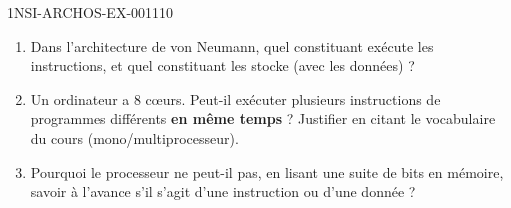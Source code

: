 \begin{exercice}{1NSI-ARCHOS-EX-001}{1}{10}
\begin{enumerate}
  \item Dans l'architecture de von Neumann, quel constituant exécute les instructions, et quel constituant les stocke (avec les données) ?
  \item Un ordinateur a $8$ cœurs. Peut-il exécuter plusieurs instructions de programmes différents \textbf{en même temps} ? Justifier en citant le vocabulaire du cours (mono/multiprocesseur).
  \item Pourquoi le processeur ne peut-il pas, en lisant une suite de bits en mémoire, savoir \og à l'avance \fg{} s'il s'agit d'une instruction ou d'une donnée ?
\end{enumerate}
\end{exercice}

%
